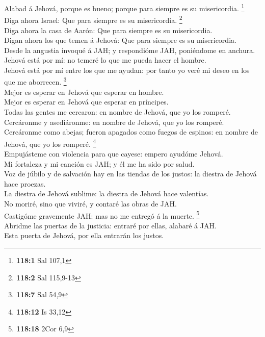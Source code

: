  Alabad á Jehová, porque es bueno; porque para siempre es su
misericordia. \footnote{\textbf{118:1} Sal 107,1}\\
 Diga ahora Israel: Que para siempre es su misericordia.
\footnote{\textbf{118:2} Sal 115,9-13}\\
 Diga ahora la casa de Aarón: Que para siempre es su
misericordia.\\
 Digan ahora los que temen á Jehová: Que para siempre es su
misericordia.\\
 Desde la angustia invoqué á JAH; y respondióme JAH,
poniéndome en anchura.\\
 Jehová está por mí: no temeré lo que me pueda hacer el
hombre.\\
 Jehová está por mí entre los que me ayudan: por tanto yo
veré mi deseo en los que me aborrecen. \footnote{\textbf{118:7} Sal 54,9}\\
 Mejor es esperar en Jehová que esperar en hombre.\\
 Mejor es esperar en Jehová que esperar en príncipes.\\
 Todas las gentes me cercaron: en nombre de Jehová, que yo
los romperé.\\
 Cercáronme y asediáronme: en nombre de Jehová, que yo los
romperé.\\
 Cercáronme como abejas; fueron apagados como fuegos de
espinos: en nombre de Jehová, que yo los romperé. \footnote{\textbf{118:12}
  Is 33,12}\\
 Empujásteme con violencia para que cayese: empero ayudóme
Jehová.\\
 Mi fortaleza y mi canción es JAH; y él me ha sido por
salud.\\
 Voz de júbilo y de salvación hay en las tiendas de los
justos: la diestra de Jehová hace proezas.\\
 La diestra de Jehová sublime: la diestra de Jehová hace
valentías.\\
 No moriré, sino que viviré, y contaré las obras de JAH.\\
 Castigóme gravemente JAH: mas no me entregó á la muerte.
\footnote{\textbf{118:18} 2Cor 6,9}\\
 Abridme las puertas de la justicia: entraré por ellas,
alabaré á JAH.\\
 Esta puerta de Jehová, por ella entrarán los justos.\\

